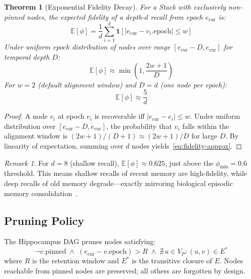 \documentclass[11pt,twocolumn]{article}
\theoremstyle{definition}
\theoremstyle{plain}
\newtheorem{theorem}{Theorem}[section]
\theoremstyle{remark}
\newtheorem{remark}{Remark}[section]
\begin{document}
\begin{theorem}[Exponential Fidelity Decay]\label{thm:fidelity-decay}
For a Stack with exclusively non-pinned nodes, the expected fidelity of a depth-$d$ recall from epoch $e_{\mathrm{cur}}$ is:
\begin{equation}\label{eq:fidelity-decay}
  \mathbb{E}[\phi] = \frac{1}{d} \sum_{i=1}^{d} \mathbf{1}\!\left[|e_{\mathrm{cur}} - v_i.\mathrm{epoch}| \leq w\right]
\end{equation}
Under uniform epoch distribution of nodes over range $[e_{\mathrm{cur}} - D, e_{\mathrm{cur}}]$ for temporal depth $D$:
\begin{equation}\label{eq:fidelity-approx}
  \mathbb{E}[\phi] \approx \min\!\left(1, \frac{2w + 1}{D}\right)
\end{equation}
For $w = 2$ (default alignment window) and $D = d$ (one node per epoch):
\begin{equation}
  \mathbb{E}[\phi] \approx \frac{5}{d}
\end{equation}
\end{theorem}

\begin{proof}
A node $v_i$ at epoch $e_i$ is recoverable iff $|e_{\mathrm{cur}} - e_i| \leq w$. Under uniform distribution over $[e_{\mathrm{cur}} - D, e_{\mathrm{cur}}]$, the probability that $v_i$ falls within the alignment window is $(2w + 1) / (D + 1) \approx (2w + 1) / D$ for large $D$. By linearity of expectation, summing over $d$ nodes yields~\eqref{eq:fidelity-approx}.
\end{proof}

\begin{remark}
For $d = 8$ (shallow recall), $\mathbb{E}[\phi] \approx 0.625$, just above the $\phi_{\min} = 0.6$ threshold. This means shallow recalls of recent memory are high-fidelity, while deep recalls of old memory degrade---exactly mirroring biological episodic memory consolidation~\cite{ebbinghaus1885memory,squire2004memory}.
\end{remark}

\subsection{Pruning Policy}

The Hippocampus DAG prunes nodes satisfying:
\begin{equation}\label{eq:prune}
  \neg v.\mathrm{pinned} \;\land\; (e_{\mathrm{cur}} - v.\mathrm{epoch}) > R \;\land\; \nexists\, u \in V_P : (u, v) \in E^*
\end{equation}
where $R$ is the retention window and $E^*$ is the transitive closure of $E$. Nodes reachable from pinned nodes are preserved; all others are forgotten by design.
\end{document}
